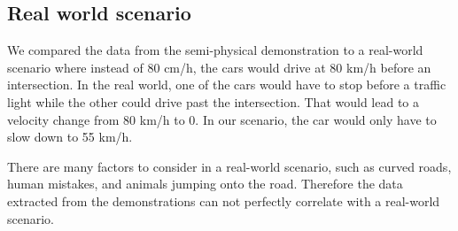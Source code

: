 \subsection{Real world scenario}

We compared the data from the semi-physical demonstration to a real-world scenario where instead of 80 cm/h, the cars would drive at 80 km/h before an intersection. In the real world, one of the cars would have to stop before a traffic light while the other could drive past the intersection. That would lead to a velocity change from 80 km/h to 0. In our scenario, the car would only have to slow down to 55 km/h.

There are many factors to consider in a real-world scenario, such as curved roads, human mistakes, and animals jumping onto the road. Therefore the data extracted from the demonstrations can not perfectly correlate with a real-world scenario. 